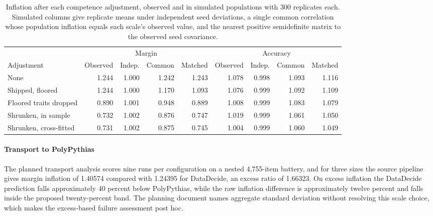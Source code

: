 \begin{table}[h]
\centering
\small
\caption{Inflation after each competence adjustment, observed and in simulated populations with 300 replicates each. Simulated columns give replicate means under independent seed deviations, a single common correlation whose population inflation equals each scale's observed value, and the nearest positive semidefinite matrix to the observed seed covariance.}
\label{tab:proxy}
\setlength{\tabcolsep}{3pt}
\begin{tabular}{lrrrrrrrr}
\toprule
& \multicolumn{4}{c}{Margin} & \multicolumn{4}{c}{Accuracy} \\
\cmidrule(lr){2-5}\cmidrule(lr){6-9}
Adjustment & Observed & Indep. & Common & Matched & Observed & Indep. & Common & Matched \\
\midrule
None & 1.244 & 1.000 & 1.242 & 1.243 & 1.078 & 0.998 & 1.093 & 1.116 \\
Shipped, floored & 1.244 & 1.000 & 1.170 & 1.093 & 1.076 & 0.999 & 1.092 & 1.109 \\
Floored traits dropped & 0.890 & 1.001 & 0.948 & 0.889 & 1.008 & 0.999 & 1.083 & 1.079 \\
Shrunken, in sample & 0.732 & 1.002 & 0.876 & 0.747 & 1.019 & 0.999 & 1.061 & 1.050 \\
Shrunken, cross-fitted & 0.731 & 1.002 & 0.875 & 0.745 & 1.004 & 0.999 & 1.060 & 1.049 \\
\bottomrule
\end{tabular}
\end{table}
\paragraph{Transport to PolyPythias}\label{app:transport}
The planned transport analysis scores nine runs per configuration on a nested 4,755-item battery, and for three sizes the source pipeline gives margin inflation of 1.40574 compared with 1.24395 for DataDecide, an excess ratio of 1.66323. On excess inflation the DataDecide prediction falls approximately 40 percent below PolyPythias, while the raw inflation difference is approximately twelve percent and falls inside the proposed twenty-percent band. The planning document names aggregate standard deviation without resolving this scale choice, which makes the excess-based failure assessment post hoc.


